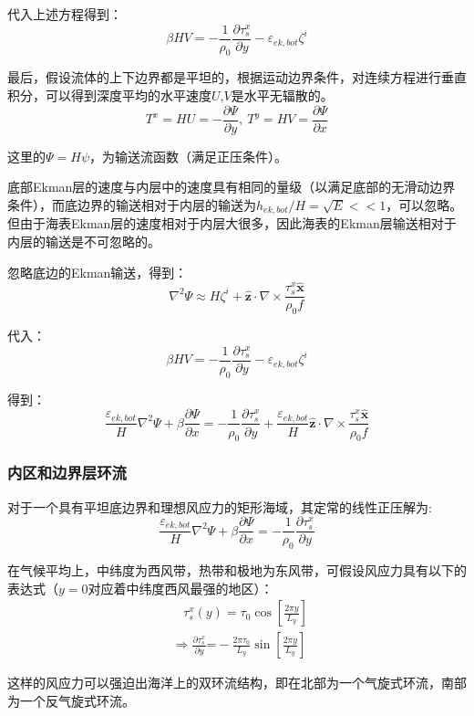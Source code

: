 \documentclass{article}
\begin{document}
代入上述方程得到：
$$\beta HV=-\frac{1}{{{\rho }_{0}}}\frac{\partial \tau _{s}^{x}}{\partial y}-{{\varepsilon }_{ek,bot}}{{\zeta }^{i}}$$

最后，假设流体的上下边界都是平坦的，根据运动边界条件，对连续方程进行垂直积分，可以得到深度平均的水平速度$U$,$V$是水平无辐散的。
$${{T}^{x}}=HU=-\frac{\partial \Psi }{\partial y},\ {{T}^{y}}=HV=\frac{\partial \Psi }{\partial x}$$

这里的$\Psi = H\psi$，为输送流函数（满足正压条件）。

底部Ekman层的速度与内层中的速度具有相同的量级（以满足底部的无滑动边界条件），而底边界的输送相对于内层的输送为$h_{ek,bot}/H=\sqrt{E}<<1$，可以忽略。但由于海表Ekman层的速度相对于内层大很多，因此海表的Ekman层输送相对于内层的输送是不可忽略的。

忽略底边的Ekman输送，得到：
$${{\nabla }^{2}}\Psi \approx H{{\zeta }^{i}}+\mathbf{\hat{z}}\cdot \nabla \times \frac{\tau _{s}^{x}\mathbf{\hat{x}}}{{{\rho }_{0}}f}$$

代入：
$$\beta HV=-\frac{1}{{{\rho }_{0}}}\frac{\partial \tau _{s}^{x}}{\partial y}-{{\varepsilon }_{ek,bot}}{{\zeta }^{i}}$$

得到：
$$\frac{{{\varepsilon }_{ek,bot}}}{H}{{\nabla }^{2}}\Psi +\beta \frac{\partial \Psi }{\partial x}=-\frac{1}{{{\rho }_{0}}}\frac{\partial \tau _{s}^{x}}{\partial y}+\frac{{{\varepsilon }_{ek,bot}}}{H}\mathbf{\hat{z}}\cdot \nabla \times \frac{\tau _{s}^{x}\mathbf{\hat{x}}}{{{\rho }_{0}}f}$$

\subsubsection{内区和边界层环流}
对于一个具有平坦底边界和理想风应力的矩形海域，其定常的线性正压解为:
$$\frac{{{\varepsilon }_{ek,bot}}}{H}{{\nabla }^{2}}\Psi +\beta \frac{\partial \Psi }{\partial x}=-\frac{1}{{{\rho }_{0}}}\frac{\partial \tau _{s}^{x}}{\partial y}$$

在气候平均上，中纬度为西风带，热带和极地为东风带，可假设风应力具有以下的表达式（$y=0$对应着中纬度西风最强的地区）：
\begin{align}
  & \ \ \ \ \tau _{s}^{x}(y)={{\tau }_{0}}\cos \left[ \frac{2\pi y}{{{L}_{y}}} \right] \\ 
 & \Rightarrow \frac{\partial \tau _{s}^{x}}{\partial y}\text{=}-\frac{2\pi {{\tau }_{0}}}{{{L}_{y}}}\sin\left[ \frac{2\pi y}{{{L}_{y}}} \right]\ \  
\end{align}

这样的风应力可以强迫出海洋上的双环流结构，即在北部为一个气旋式环流，南部为一个反气旋式环流。
\end{document}
